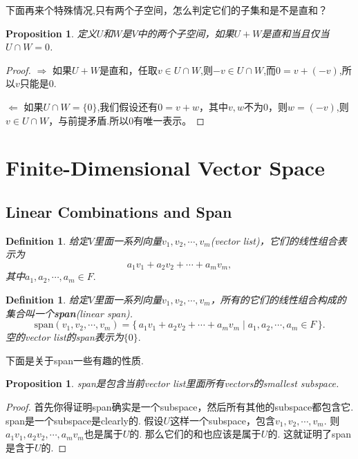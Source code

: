 \documentclass{article}
\newtheorem{proposition}[theorem]{Proposition}
\newtheorem{definition}[theorem]{Definition}
\newcommand\Set[2]{\{\,#1\mid#2\,\}} %
\begin{document}
{\color{red} 下面再来个特殊情况,只有两个子空间，怎么判定它们的子集和是不是直和}？

\begin{proposition}
定义$U$和$W$是$V$中的两个子空间，如果$U+W$是直和当且仅当$U \cap W = {0}$.
\end{proposition}

\begin{proof}
$\Rightarrow$ 如果$U+W$是直和，任取$v \in U \cap W$,则$-v \in U \cap W$,而$0 = v + (-v)$,所以$v$只能是$0$.

$\Leftarrow$ 如果$U \cap W = \{0\}$,我们假设还有$0 = v+w$，其中$v,w$不为0，则$w=(-v)$,则$v \in U \cap W$，与前提矛盾.所以$0$有唯一表示。
\end{proof}

\newpage
\section{Finite-Dimensional Vector Space}

\subsection{Linear Combinations and Span}

\begin{definition}
\rm 给定$V$里面一系列向量$v_1,v_2,\cdots,v_m$(vector list)，它们的线性组合表示为
$$
a_1v_1 + a_2v_2 + \cdots + a_mv_m,
$$
其中$a_1,a_2,\cdots,a_m \in F.$
\end{definition}

\begin{definition}
\rm 给定$V$里面一系列向量$v_1,v_2,\cdots,v_m$，所有的它们的线性组合构成的集合叫一个\textbf{span}(linear span). 
$$
\text{span}(v_1,v_2,\cdots,v_m) = \Set{a_1v_1 + a_2v_2 + \cdots + a_mv_m}{a_1,a_2,\cdots,a_m \in F}.
$$
空的vector list的span表示为$\{0\}.$
\end{definition}

{\color{red}下面是关于span一些有趣的性质}.

\begin{proposition}
\rm span是包含当前vector list里面所有vectors的smallest subspace.
\end{proposition}

\begin{proof}
\rm 首先你得证明span确实是一个subspace，然后所有其他的subspace都包含它. span是一个subspace是clearly的. 假设$U$这样一个subspace，包含$v_1,v_2,\cdots,v_m$. 则$a_1v_1,a_2v_2,\cdots,a_mv_m$也是属于$U$的. 那么它们的和也应该是属于$U$的. 这就证明了span是含于$U$的. 
\end{proof}
\end{document}
